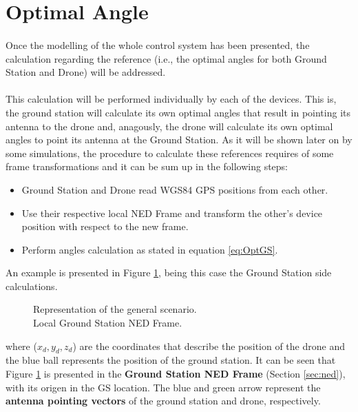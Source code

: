 \section{Optimal Angle}\label{sec:opt_angle}
\paragraph{} Once the modelling of the whole control system has been presented, the calculation regarding the reference (i.e., the optimal angles for both Ground Station and Drone) will be addressed.

\paragraph{} This calculation will be performed individually by each of the devices. This is, the ground station will calculate its own optimal angles that result in pointing its antenna to the drone and, anagously, the drone will calculate its own optimal angles to point its antenna at the Ground Station.
As it will be shown later on by some simulations, the procedure to calculate these references requires of some frame transformations and it can be sum up in the following steps:
\begin{itemize}
\item{Ground Station and Drone read WGS84 GPS positions from each other.}
\item{Use their respective local NED Frame and transform the other's device position with respect to the new frame.}
\item{Perform angles calculation as stated in equation \ref{eq:OptGS}.}
\end{itemize}

An example is presented in Figure \ref{fig:Scenario1}, being this case the Ground Station side calculations.
\begin{figure}[H]
   \centering
     
    \caption{Representation of the general scenario. \\Local Ground Station NED Frame.}
    \label{fig:Scenario1}
\end{figure}
where ($x_d,y_d,z_d$) are the coordinates that describe the position of the drone and the blue ball represents the position of the ground station. It can be seen that Figure \ref{fig:Scenario1} is presented in the \textbf{Ground Station NED Frame} (Section \ref{sec:ned}), with its origen in the GS location.
The blue and green arrow represent the \textbf{antenna pointing vectors} of the ground station and drone, respectively.


